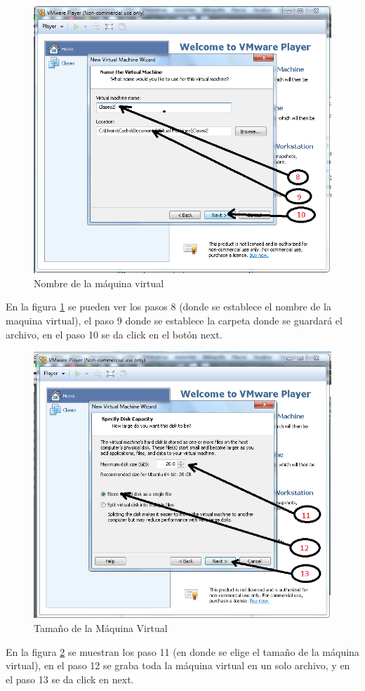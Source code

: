 \documentclass[12pt, twoside]{report}
\begin{document}
\begin{figure}
	\centering
	\includegraphics[width=1.0\linewidth]{VMwarePlayer8y9y10.png}
	\caption{Nombre de la máquina virtual}
	\label{fig1012}
\end{figure}
  
En la figura \ref{fig1012} se pueden ver los pasos 8 (donde se establece el nombre de la maquina virtual), el paso 9 donde se establece la carpeta donde se guardará el archivo, en el paso 10 se da click en el botón next.

\begin{figure}
	\centering
	\includegraphics[width=1.0\linewidth]{VMwarePlayer11y12y13.png}
	\caption{Tamaño de la Máquina Virtual}
	\label{fig1013}
\end{figure}
En la figura \ref{fig1013} se muestran los paso 11 (en donde se elige el tamaño de la máquina virtual), en el paso 12 se graba toda la máquina virtual en un solo archivo, y en el paso 13 se da click en next.
\end{document}
